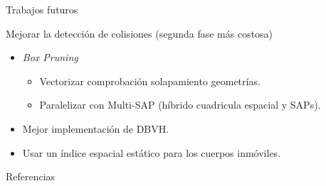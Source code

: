 \documentclass[10pt,xcolor=table]{beamer}
\begin{document}
\begin{frame}{Trabajos futuros}
  \begin{block}{Mejorar la detección de colisiones (segunda fase más costosa)}
    \begin{itemize}
    \item \textit{Box Pruning}
      \begin{itemize}
      \item Vectorizar comprobación solapamiento geometrías.
      \item Paralelizar con Multi-SAP (híbrido cuadricula espacial y SAPs).
      \end{itemize}
    \item Mejor implementación de DBVH.
    \item Usar un índice espacial estático para los cuerpos inmóviles.
    \end{itemize}
  \end{block}
\end{frame}

\appendix

\begin{frame}{Referencias}

  \nocite{*}
  \printbibliography[heading=none]

\end{frame}
\end{document}
